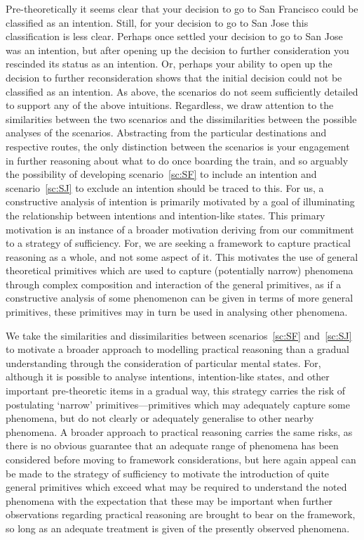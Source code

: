 \documentclass[10pt]{article}
\begin{document}
Pre-theoretically it seems clear that your decision to go to San Francisco could be classified as an intention.
Still, for your decision to go to San Jose this classification is less clear.
Perhaps once settled your decision to go to San Jose was an intention, but after opening up the decision to further consideration you rescinded its status as an intention.
Or, perhaps your ability to open up the decision to further reconsideration shows that the initial decision could not be classified as an intention.
As above, the scenarios do not seem sufficiently detailed to support any of the above intuitions.
Regardless, we draw attention to the similarities between the two scenarios and the dissimilarities between the possible analyses of the scenarios.
Abstracting from the particular destinations and respective routes, the only distinction between the scenarios is your engagement in further reasoning about what to do once boarding the train, and so arguably the possibility of developing scenario~\ref{sc:SF} to include an intention and scenario~\ref{sc:SJ} to exclude an intention should be traced to this.
For us, a constructive analysis of intention is primarily motivated by a goal of illuminating the relationship between intentions and intention-like states.
This primary motivation is an instance of a broader motivation deriving from our commitment to a strategy of sufficiency.
For, we are seeking a framework to capture practical reasoning as a whole, and not some aspect of it.
This motivates the use of general theoretical primitives which are used to capture (potentially narrow) phenomena through complex composition and interaction of the general primitives, as if a constructive analysis of some phenomenon can be given in terms of more general primitives, these primitives may in turn be used in analysing other phenomena.

We take the similarities and dissimilarities between scenarios~\ref{sc:SF} and~\ref{sc:SJ} to motivate a broader approach to modelling practical reasoning than a gradual understanding through the consideration of particular mental states.
For, although it is possible to analyse intentions, intention-like states, and other important pre-theoretic items in a gradual way, this strategy carries the risk of postulating `narrow' primitives---primitives which may adequately capture some phenomena, but do not clearly or adequately generalise to other nearby phenomena.
A broader approach to practical reasoning carries the same risks, as there is no obvious guarantee that an adequate range of phenomena has been considered before moving to framework considerations, but here again appeal can be made to the strategy of sufficiency to motivate the introduction of quite general primitives which exceed what may be required to understand the noted phenomena with the expectation that these may be important when further observations regarding practical reasoning are brought to bear on the framework, so long as an adequate treatment is given of the presently observed phenomena.
\end{document}
